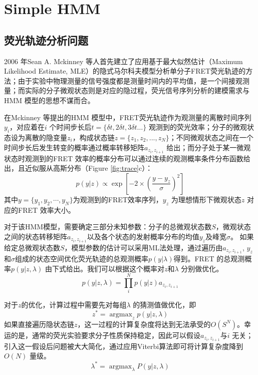 \documentclass[11pt, a4paper]{article}
\DeclareMathOperator*{\argmax}{argmax}
\begin{document}
\section{Simple HMM}\label{chapter:HMM}
\subsection{荧光轨迹分析问题}

2006 年Sean A. Mckinney 等人首先建立了应用基于最大似然估计（Maximum Likelihood Estimate, MLE）的隐式马尔科夫模型分析单分子FRET荧光轨迹的方法\cite{HMM}；由于实验中物理测量的信号强度都是测量时间内的平均值，是一个间接观测量；而实际的分子微观状态则是对应的隐过程，荧光信号序列分析的建模需求与HMM 模型的思想不谋而合。

在Mckinney 等提出的HMM 模型中，FRET荧光轨迹作为观测量的离散时间序列$y_i$，对应着在$i$ 个时间步长后$t=\{\delta t,2\delta t,3\delta t…\}$ 观测到的荧光效率；分子的微观状态设为离散的隐变量$z_i$，构成状态链$z=\{z_1,z_2,...,z_N\}$；不同微观状态之间在一个时间步长后发生转变的概率通过概率转移矩阵$a_{z_{i}, z_{i+1}}$ 给出；而分子处于某一微观状态时观测到的FRET 效率的概率分布可以通过连续的观测概率条件分布函数给出，且近似服从高斯分布（Figure \ref{fig:trace}c）：
\begin{equation}
p(y|z) \propto \exp\left[-2\times\left(\frac{y- y_z}{\sigma}\right)^2\right]
\end{equation}
其中$y=\{y_1, y_2,\cdots, y_N\}$为观测到的FRET效率序列，$y_{z}$ 为理想情形下微观状态$z$ 对应的FRET 效率大小。

对于该HMM模型，需要确定三部分未知参数：分子的总微观状态数$S$，微观状态之间的状态转移矩阵$a_{z_i, z_{i+1}}$以及各个状态的发射概率分布的均值$y_{z}$及峰宽$\sigma$。 如果给定总微观状态数$S$，模型参数的估计可以采用ML法处理，通过遍历由$a_{z_{i}, z_{i+1}}$, $y_{z} $和$\sigma$组成的状态空间优化荧光轨迹的总观测概率$p(y| \lambda)$得到。FRET 的总观测概率$p(y|z,\lambda)$ 由下式给出。我们可以根据这个概率对$z$和$\lambda$ 分别做优化。
\begin{equation}
p(y|z,\lambda)= \prod_i^N p(y|z) a_{z_{i}, z_{i+1}}
\end{equation}


对于$z$的优化，计算过程中需要先对每组$\lambda$ 的猜测值做优化，即
\begin{equation}\label{eqn:z_opt}
  z^*=\argmax_z p(y|z, \lambda)
\end{equation}
如果直接遍历隐状态链$z$，这一过程的计算复杂度将达到无法承受的$O(S^N)$。幸运的是，通常的荧光实验要求分子性质保持稳定，因此可以假设$a_{z_{i}, z_{i+1}}$与$i$ 无关；引入这一假设后问题被大大简化，通过应用Viterbi算法即可将计算复杂度降到$O(N)$ 量级。
\begin{equation}
\lambda^*=\argmax_{\lambda} P(y|z,\lambda)
\end{equation}
\end{document}
